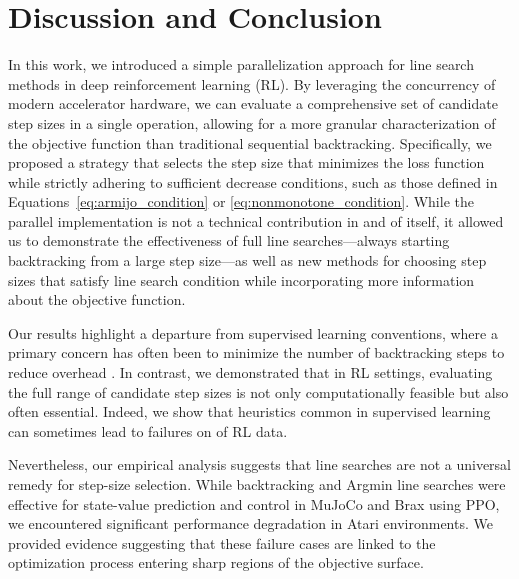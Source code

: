 \documentclass[10pt]{article} %
\begin{document}
\section{Discussion and Conclusion}
In this work, we introduced a simple parallelization approach for line search methods in deep reinforcement learning (RL). By leveraging the concurrency of modern accelerator hardware, we can evaluate a comprehensive set of candidate step sizes in a single operation, allowing for a more granular characterization of the objective function than traditional sequential backtracking. Specifically, we proposed a strategy that selects the step size that minimizes the loss function while strictly adhering to sufficient decrease conditions, such as those defined in Equations~\ref{eq:armijo_condition} or \ref{eq:nonmonotone_condition}. While the parallel implementation is not a technical contribution in and of itself, it allowed us to demonstrate the effectiveness of full line searches---always starting backtracking from a large step size---as well as new methods for choosing step sizes that satisfy line search condition while incorporating more information about the objective function. 

Our results highlight a departure from supervised learning conventions, where a primary concern has often been to minimize the number of backtracking steps to reduce overhead \citep{vaswani2019painless, galli2023monotone}. In contrast, we demonstrated that in RL settings, evaluating the full range of candidate step sizes is not only computationally feasible but also often essential. Indeed, we show that heuristics common in supervised learning can sometimes lead to failures on of RL data.

Nevertheless, our empirical analysis suggests that line searches are not a universal remedy for step-size selection. While backtracking and Argmin line searches were effective for state-value prediction and control in MuJoCo and Brax using PPO, we encountered significant performance degradation in Atari environments. We provided evidence suggesting that these failure cases are linked to the optimization process entering sharp regions of the objective surface. 
\end{document}
